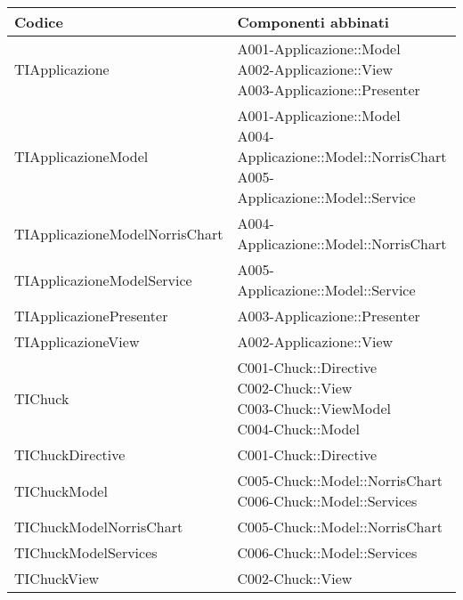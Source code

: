 
				\begin{longtabu} spread 1cm [c]{|p{5cm}|p{9cm}|}
					\hline
					\rowfont{\bf \centering}
					Codice &
					Componenti abbinati \\
					\hline
					\endhead
					
					TIApplicazione & \parbox[t]{4cm}{ A001-Applicazione::Model \\ A002-Applicazione::View \\ A003-Applicazione::Presenter }\\
                \hline
                TIApplicazioneModel & \parbox[t]{4cm}{ A001-Applicazione::Model \\ A004-Applicazione::Model::NorrisChart \\ A005-Applicazione::Model::Service }\\
                \hline
                TIApplicazioneModelNorrisChart & \parbox[t]{4cm}{ A004-Applicazione::Model::NorrisChart }\\
                \hline
                TIApplicazioneModelService & \parbox[t]{4cm}{ A005-Applicazione::Model::Service }\\
                \hline
                TIApplicazionePresenter & \parbox[t]{4cm}{ A003-Applicazione::Presenter }\\
                \hline
                TIApplicazioneView & \parbox[t]{4cm}{ A002-Applicazione::View }\\
                \hline
                TIChuck & \parbox[t]{4cm}{ C001-Chuck::Directive \\ C002-Chuck::View \\ C003-Chuck::ViewModel \\ C004-Chuck::Model }\\
                \hline
                TIChuckDirective & \parbox[t]{4cm}{ C001-Chuck::Directive }\\
                \hline
                TIChuckModel & \parbox[t]{4cm}{ C005-Chuck::Model::NorrisChart \\ C006-Chuck::Model::Services }\\
                \hline
                TIChuckModelNorrisChart & \parbox[t]{4cm}{ C005-Chuck::Model::NorrisChart }\\
                \hline
                TIChuckModelServices & \parbox[t]{4cm}{ C006-Chuck::Model::Services }\\
                \hline
                TIChuckView & \parbox[t]{4cm}{ C002-Chuck::View }\\
                \hline

\end{longtabu}
